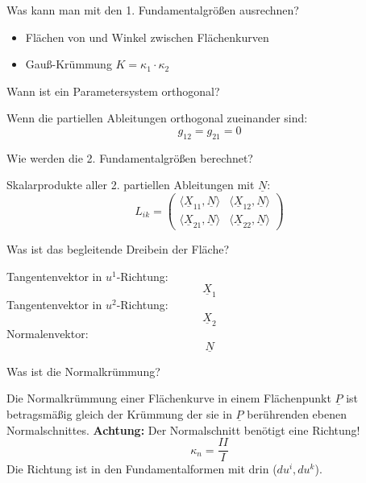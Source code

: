 \documentclass[twocolumn, fontsize=8pt, DIV=1]{scrartcl}
\begin{document}
\begin{framed}
    Was kann man mit den 1. Fundamentalgrößen ausrechnen?
\end{framed}
\begin{itemize}
    \item Flächen von und Winkel zwischen Flächenkurven
    \item Gauß-Krümmung $K = \kappa_1 \cdot \kappa_2$
\end{itemize}



\begin{framed}
    Wann ist ein Parametersystem orthogonal?
\end{framed}
Wenn die partiellen Ableitungen orthogonal zueinander sind:
\[
    g_{12} = g_{21} = 0
\]



\begin{framed}
    Wie werden die 2. Fundamentalgrößen berechnet?
\end{framed}
Skalarprodukte aller 2. partiellen Ableitungen mit $\underline{N}$:
\[
    L_{ik} =
        \left(
            \begin{array}{rr}
                \langle \underline{X}_{11}, \underline{N} \rangle & \langle \underline{X}_{12}, \underline{N} \rangle \\
                \langle \underline{X}_{21}, \underline{N} \rangle & \langle \underline{X}_{22}, \underline{N} \rangle
            \end{array}
        \right)
\]



\begin{framed}
    Was ist das begleitende Dreibein der Fläche?
\end{framed}
Tangentenvektor in $u^1$-Richtung:
\[
    \underline{X}_1
\]
Tangentenvektor in $u^2$-Richtung:
\[
    \underline{X}_2
\]
Normalenvektor:
\[
    \underline{N}
\]



\begin{framed}
    Was ist die Normalkrümmung?
\end{framed}
Die Normalkrümmung einer Flächenkurve in einem Flächenpunkt $\underline{P}$ ist betragsmäßig gleich der Krümmung der sie in $\underline{P}$ berührenden ebenen Normalschnittes. \textbf{Achtung:} Der Normalschnitt benötigt eine Richtung!
\[
    \kappa_n = \frac{II}{I}
\]
Die Richtung ist in den Fundamentalformen mit drin ($du^i, du^k$).
\end{document}
